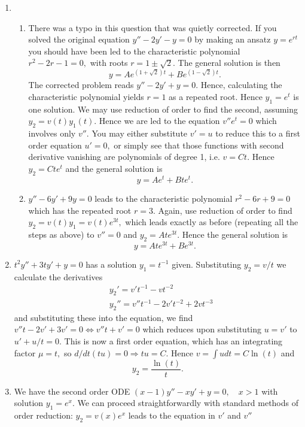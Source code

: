 \documentclass[a4paper,12pt,leqno]{article}
\begin{document}

\begin{enumerate}
\item \begin{enumerate}
\item There was a typo in this question that was quietly corrected. If you solved the original equation $y'' - 2y' - y = 0$ by making an ansatz $y = e^{rt}$ you should have been led to the characteristic polynomial $r^2 - 2r -1 = 0,$ with roots $r = 1 \pm \sqrt{2}.$ The general solution is then 
\[ y = A e^{(1 + \sqrt{2})t} + B e^{(1 - \sqrt{2})t}. \]
The corrected problem reads $y'' - 2y' + y = 0.$ Hence, calculating the characteristic polynomial yields $r = 1$ as a repeated root. Hence $y_1 = e^t$ is one solution. We may use reduction of order to find the second, assuming $y_2 = v(t) y_1(t).$ Hence we are led to the equation $v''e^t = 0$ which involves only $v''.$ You may either substitute $v' = u$ to reduce this to a first order equation $u' = 0,$ or simply see that those functions with second derivative vanishing are polynomials of degree 1, i.e. $v = Ct.$ Hence $y_2 = Ct e^t$ and the general solution is 
\[ y = Ae^t + Bt e^t. \]
\item $y'' - 6y' + 9y = 0$ leads to the characteristic polynomial $r^2 -6r + 9 = 0$ which has the repeated root $r = 3.$ Again, use reduction of order to find $y_2 = v(t) y_1 = v(t) e^{3t},$ which leads exactly as before (repeating all the steps as above) to $v'' = 0$ and $y_2 = Ate^{3t}.$ Hence the general solution is
\[ y = Ate^{3t} + B e^{3t}. \]  
\end{enumerate}
\item $t^2 y'' + 3ty' + y = 0$ has a solution $y_1 = t^{-1}$ given. Substituting $y_2 = v/t$ we calculate the derivatives
\begin{align*}
& y_2' = v' t^{-1} - v t^{-2} \\
& y_2'' = v''t^{-1} - 2v' t^{-2} + 2v t^{-3} 
\end{align*}
and substituting these into the equation, we find $v''t - 2v' + 3v' = 0 \Leftrightarrow v''t + v' = 0$ which reduces upon substituting $u = v'$ to $u' + u/t = 0.$ This is now a first order equation, which has an integrating factor $\mu = t,$ so $d/dt (tu) = 0 \Rightarrow tu = C.$ Hence $v = \int u dt = C \ln(t)$ and 
\[ y_2 = \frac{\ln(t)}{t}. \]
\item We have the second order ODE $(x-1)y'' - xy' + y = 0, \quad x> 1$ with solution $y_1 = e^x.$ We can proceed straightforwardly with standard methods of order reduction: $y_2 = v(x) e^x$ leads to the equation in $v'$ and $v''$

\end{enumerate}
\end{document}
